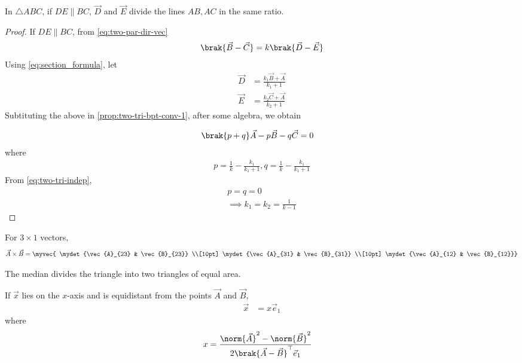   \item In $\triangle ABC$, if $DE \parallel BC$, $\vec{D}$ and $\vec{E}$ divide the lines $AB, AC$ in the same ratio.  
	  \label{prop:two-tri-bpt-conv}
	  \begin{proof}
If $DE \parallel BC$,
		  from 
 \eqref{eq:two-par-dir-vec}
  \begin{align}
	  \label{prop:two-tri-bpt-conv-1}
	  \brak{\vec{B}- \vec{C}} = k\brak{\vec{D}-	  \vec{E}}
  \end{align}
Using   
	  \eqref{eq:section_formula}, 
let 
  \begin{align}
	  \vec{D}&= \frac{k_1\vec{B}+ \vec{A}}{k_1+1}
	  \\
	  \vec{E}&= \frac{k_2\vec{C}+ \vec{A}}{k_2+1}
  \end{align}
	  Subtituting the above in 
	  \eqref{prop:two-tri-bpt-conv-1}, after some algebra, we obtain 
	
  \begin{align}
\brak{p+q}\vec{A}- p\vec{B} -q\vec{C} &= 0
  \end{align}
  where
  \begin{align}
	  p = \frac{1}{k} -  \frac{k_1}{k_1+1},
	  q = \frac{1}{k} -  \frac{k_1}{k_1+1}
  \end{align}
From 	  
	  \eqref{eq:two-tri-indep},
  \begin{align}
	p = q = 0
	  \\
	  \implies k_1 = k_2  = \frac{1}{k-1}
  \end{align}

	  \end{proof}
	  \fi
  \iffalse
\item For  $3 \times 1$ vectors, 
\begin{align}
  \label{eq:cross3d}
	\vec{A} \times \vec{B} = \myvec{ \mydet{\vec{A}_{23} & \vec{B}_{23}} \\[10pt] \mydet{\vec{A}_{31} & \vec{B}_{31}} \\[10pt] \mydet{\vec{A}_{12}  & \vec{B}_{12}}}
\end{align}
  \item The median divides the triangle into two triangles of equal area.
	  \label{prop:two-median-area}
\item If $\vec{x}$ lies on the  $x$-axis and is  equidistant from the points $\vec{A}$ and $\vec{B}$, 
  \begin{align}
	  \vec{x} &=
	   x\vec{e}_1
  \end{align}
  where 
  \begin{align}
	  x &=\frac{\norm{\vec{A}}^2 -\norm{\vec{B}}^2 }{2\brak{\vec{A}-\vec{B}}^{\top }\vec{e}_1
}
	  \label{eq:cbse_10_x}
  \end{align}
